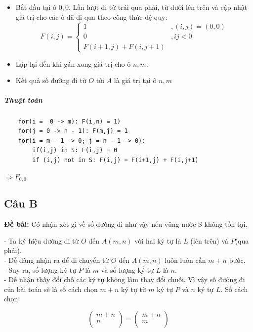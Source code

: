 \documentclass[12pt]{article}
\begin{document}
\begin{sloppypar}
\begin{itemize}
    \item Bắt đầu tại ô \(0,0\). Lần lượt đi từ trái qua phải, từ dưới lên trên và cập nhật giá trị cho các ô đã đi qua theo công thức đệ quy:
    \[ F(i,j) = 
    \begin{cases}
        1     & , (i,j) = (0,0) \\
        0     &, ij < 0 \\
        F(i + 1,j) + F(i, j + 1) 
    \end{cases}
    \]
    \item Lặp lại đến khi gán xong giá trị cho ô \(n,m\).
    \item Kết quả số đường đi từ \(O\) tới \(A\) là giá trị tại ô \(n,m\)
\end{itemize}

\subparagraph{Thuật toán}
\begin{verbatim}
    for(i =  0 -> m): F(i,n) = 1)
    for(j = 0 -> n - 1): F(m,j) = 1
    for(i = m - 1 -> 0; j = n - 1 -> 0):
        if(i,j) in S: F(i,j) = 0
        if (i,j) not in S: F(i,j) = F(i+1,j) + F(i,j+1)
\end{verbatim}

\(\Rightarrow F_{0,0}\)

\subsection{Câu B}
\begin{tcolorbox}
    \textbf{Đề bài:} Có nhận xét gì về số đường đi như vậy nếu vũng nước S không tồn tại.
\end{tcolorbox}

- Ta ký hiệu đường đi từ \(O\) đến \(A(m,n)\) với hai ký tự là \(L\) (lên trên) và \(P\)(qua phải). \\
- Dễ dàng nhận ra để di chuyển từ \(O\) đến \(A(m,n)\) luôn luôn cần \(m+n\) bước. \\
- Suy ra, số lượng ký tự \(P\) là \(m\) và số lượng ký tự \(L\) là \(n\). \\
- Dễ nhận thấy đổi chỗ các ký tự không làm thay đổi chuỗi. Vì vậy số đường đi của bài toán sẽ là số cách chọn \(m+n\) ký tự từ \(m\) ký tự \(P\) và \(n\) ký tự \(L\). Số cách chọn:

\begin{equation*}
    \begin{pmatrix} m + n \\ n \\ \end{pmatrix} = \begin{pmatrix} m + n \\ m \\ \end{pmatrix}
\end{equation*}

\end{sloppypar}
\end{document}
